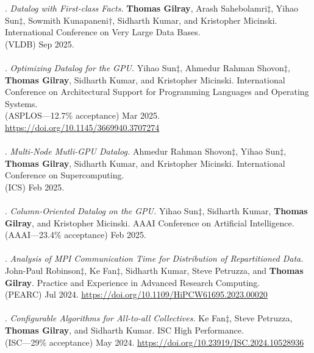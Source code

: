 \paper. \textit{Datalog with First-class Facts.}
\textbf{Thomas Gilray}, Arash Sahebolamri$\ddagger$, Yihao Sun$\ddagger$, Sowmith Kunapaneni$\dagger$, Sidharth Kumar, and Kristopher Micinski.
International Conference on Very Large Data Bases.
\\(VLDB) Sep 2025.
\\ \vspace{-0.1cm}\\
\paper. \textit{Optimizing Datalog for the GPU.}
Yihao Sun$\ddagger$, Ahmedur Rahman Shovon$\ddagger$, \textbf{Thomas Gilray}, Sidharth Kumar, and Kristopher Micinski.
International Conference on Architectural Support for Programming Languages and Operating Systems.
\\(ASPLOS---12.7\% acceptance) Mar 2025. \url{https://doi.org/10.1145/3669940.3707274}
\\ \vspace{-0.1cm}\\
\paper. \textit{Multi-Node Mutli-GPU Datalog.}
Ahmedur Rahman Shovon$\ddagger$, Yihao Sun$\ddagger$, \textbf{Thomas Gilray}, Sidharth Kumar, and Kristopher Micinski.
International Conference on Supercomputing.
\\(ICS) Feb 2025.
\\ \vspace{-0.1cm}\\
\paper. \textit{Column-Oriented Datalog on the GPU.}
Yihao Sun$\ddagger$, Sidharth Kumar, \textbf{Thomas Gilray}, and Kristopher Micinski.
AAAI Conference on Artificial Intelligence.
\\(AAAI---23.4\% acceptance) Feb 2025.
\\ \vspace{-0.1cm}\\
\paper. \textit{Analysis of MPI Communication Time for Distribution of Repartitioned Data.}
John-Paul Robinson$\ddagger$, Ke Fan$\ddagger$, Sidharth Kumar, Steve Petruzza, and \textbf{Thomas Gilray}.
Practice and Experience in Advanced Research Computing.
\\(PEARC) Jul 2024. \url{https://doi.org/10.1109/HiPCW61695.2023.00020}
\\ \vspace{-0.1cm}\\
\paper. \textit{Configurable Algorithms for All-to-all Collectives.}
Ke Fan$\ddagger$, Steve Petruzza, \textbf{Thomas Gilray}, and Sidharth Kumar.
ISC High Performance.
\\(ISC---29\% acceptance) May 2024. \url{https://doi.org/10.23919/ISC.2024.10528936}
\\ \vspace{-0.1cm}\\
